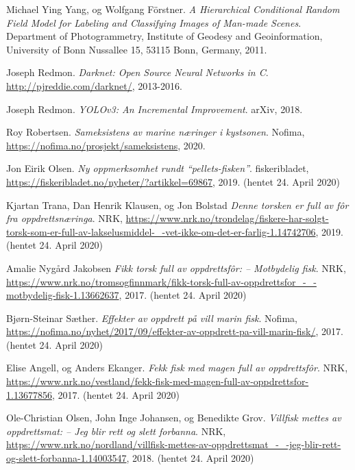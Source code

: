 \documentclass[11ot]{article}
\begin{document}
\begin{thebibliography}{9}
Michael Ying Yang, og Wolfgang Förstner. 
\textit{A Hierarchical Conditional Random Field Model for Labeling and Classifying Images of Man-made Scenes}. 
Department of Photogrammetry, Institute of Geodesy and Geoinformation, University of Bonn Nussallee 15, 53115 Bonn, Germany, 2011.

Joseph Redmon. 
\textit{Darknet: Open Source Neural Networks in C}. 
\url{http://pjreddie.com/darknet/}, 2013-2016.

Joseph Redmon. 
\textit{YOLOv3: An Incremental Improvement}. 
arXiv, 2018.

Roy Robertsen. 
\textit{Sameksistens av marine næringer i kystsonen}. 
Nofima, \url{https://nofima.no/prosjekt/sameksistens}, 2020.

Jon Eirik Olsen. 
\textit{Ny oppmerksomhet rundt “pellets-fisken”}. 
fiskeribladet, \url{https://fiskeribladet.no/nyheter/?artikkel=69867}, 2019. (hentet 24. April 2020)

Kjartan Trana, Dan Henrik Klausen, og Jon Bolstad 
\textit{Denne torsken er full av fôr fra oppdrettsnæringa}. 
NRK, \url{https://www.nrk.no/trondelag/fiskere-har-solgt-torsk-som-er-full-av-lakselusmiddel-_-vet-ikke-om-det-er-farlig-1.14742706}, 2019. (hentet 24. April 2020)

 Amalie Nygård Jakobsen
\textit{Fikk torsk full av oppdrettsfôr: – Motbydelig fisk}. 
NRK, \url{https://www.nrk.no/tromsogfinnmark/fikk-torsk-full-av-oppdrettsfor_-_-motbydelig-fisk-1.13662637}, 2017. (hentet 24. April 2020)

Bjørn-Steinar Sæther. 
\textit{Effekter av oppdrett på vill marin fisk}. 
Nofima, \url{https://nofima.no/nyhet/2017/09/effekter-av-oppdrett-pa-vill-marin-fisk/}, 2017. (hentet 24. April 2020)

Elise Angell, og Anders Ekanger. 
\textit{Fekk fisk med magen full av oppdrettsfôr}. 
NRK, \url{https://www.nrk.no/vestland/fekk-fisk-med-magen-full-av-oppdrettsfor-1.13677856}, 2017. (hentet 24. April 2020)

Ole-Christian Olsen, John Inge Johansen, og Benedikte Grov. 
\textit{Villfisk mettes av oppdrettsmat: – Jeg blir rett og slett forbanna}. 
NRK, \url{https://www.nrk.no/nordland/villfisk-mettes-av-oppdrettsmat_-_-jeg-blir-rett-og-slett-forbanna-1.14003547}, 2018. (hentet 24. April 2020)


\end{thebibliography}
\end{document}
